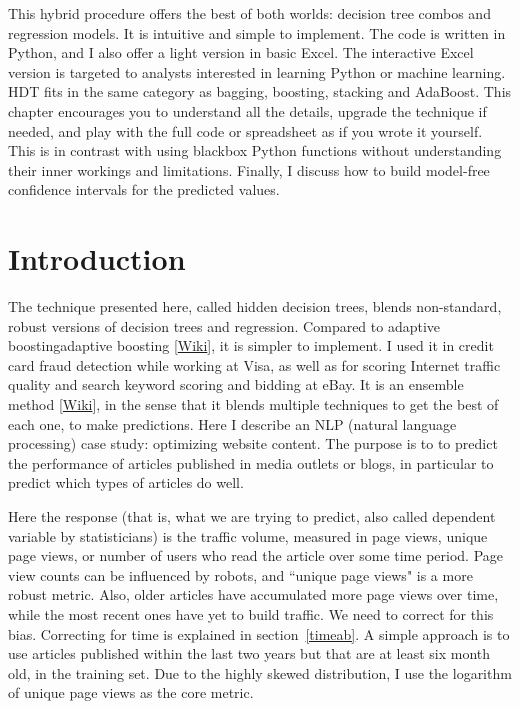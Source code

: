 \documentclass[oneside,10pt]{book}
\begin{document}
This hybrid procedure offers the best of both worlds: decision tree combos  and \textcolor{index}{regression} models.  It is intuitive and simple to implement. The code is written in Python, and I also offer a light version in basic Excel. The interactive Excel version is targeted to analysts interested in learning Python or machine learning. HDT fits in the same category as bagging, \textcolor{index}{boosting}, stacking and \textcolor{index}{AdaBoost}.  This chapter encourages you to understand all the details, upgrade the technique if needed, and play with the full code or spreadsheet as if you wrote it yourself. This is in contrast with using blackbox Python functions without understanding their inner workings and limitations. Finally, I discuss how to build model-free confidence intervals for the predicted values.

 \section{Introduction}

The technique presented here, called \textcolor{index}{hidden decision trees}, blends non-standard, robust versions of 
 \textcolor{index}{decision trees} and regression. Compared to \textcolor{index}{adaptive boosting}\textcolor{index}{adaptive boosting} [\href{https://en.wikipedia.org/wiki/AdaBoost}{Wiki}], it is simpler to implement. I used it in credit card fraud detection while working at Visa, as well as for scoring Internet traffic quality and search keyword scoring and bidding at eBay. It is an \textcolor{index}{ensemble method} [\href{https://en.wikipedia.org/wiki/Ensemble_learning}{Wiki}], in the sense that it 
blends multiple techniques to get the best of each one, to make predictions.  Here I describe an NLP (\textcolor{index}{natural language processing}) case study: optimizing website content. 
The purpose is to to predict the performance of articles published in media outlets or blogs, in particular to predict which types of articles do well.


Here the response (that is, what we are trying to predict, also called dependent variable by statisticians) is the traffic volume, measured in page views, unique page views, or number of users who read the article over some time period. Page view counts
can be influenced by robots, and ``unique page views" is a more robust metric. Also, older articles have accumulated more page views over time, while the most recent ones
 have yet to build traffic. We need to correct for this bias. 
Correcting for time is explained in section~\ref{timeab}. A simple approach is to use articles published within the last two years but that are at least six month old, in the \textcolor{index}{training set}. Due to
 the highly skewed distribution, I use the logarithm of unique page views as the core metric. 
\end{document}
